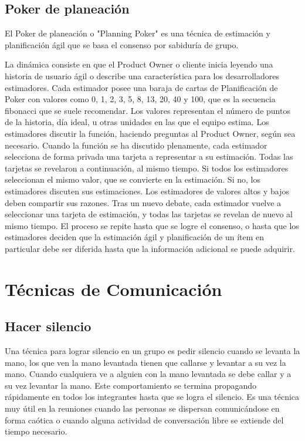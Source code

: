 \subsection{Poker de planeación}

El Poker de planeación o "Planning Poker" es una técnica de estimación y planificación ágil que se basa el consenso por sabiduría de grupo. 

La dinámica consiste en que el Product Owner o cliente inicia leyendo una historia de usuario ágil o describe una característica para los desarrolladores estimadores. Cada estimador posee una baraja de cartas de Planificación de Poker con valores como 0, 1, 2, 3, 5, 8, 13, 20, 40 y 100, que es la secuencia fibonacci que se suele recomendar. Los valores representan el número de puntos de la historia, día ideal, u otras unidades en las que el equipo estima. Los estimadores discutir la función, haciendo preguntas al Product Owner, según sea necesario. Cuando la función se ha discutido plenamente, cada estimador selecciona de forma privada una tarjeta a representar a su estimación. Todas las tarjetas se revelaron a continuación, al mismo tiempo. Si todos los estimadores seleccionan el mismo valor, que se convierte en la estimación. Si no, los estimadores discuten sus estimaciones. Los estimadores de valores altos y bajos deben compartir sus razones. Tras un nuevo debate, cada estimador vuelve a seleccionar una tarjeta de estimación, y todas las tarjetas se revelan de nuevo al mismo tiempo. El proceso se repite hasta que se logre el consenso, o hasta que los estimadores deciden que la estimación ágil y planificación de un ítem en particular debe ser diferida hasta que la información adicional se puede adquirir.

\newpage
\section{Técnicas de Comunicación}

\subsection{Hacer silencio}

Una técnica para lograr silencio en un grupo es pedir silencio cuando se levanta la mano, los que ven la mano levantada tienen que callarse y levantar a su vez la mano. Cuando cualquiera ve a alguien con la mano levantada se debe callar y a su vez levantar la mano. Este comportamiento se termina propagando rápidamente en todos los integrantes hasta que se logra el silencio. Es una técnica muy útil en la reuniones cuando las personas se dispersan comunicándose en forma caótica o cuando alguna actividad de conversación libre se extiende del tiempo necesario.



